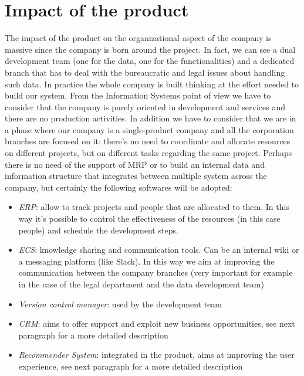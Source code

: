 \documentclass[../main.tex]{subfiles}
\begin{document}
    \section{Impact of the product}
    The impact of the product on the organizational aspect of the company is massive since the company is born around the project. In fact, we can see a dual development team (one for the data, one for the functionalities) and a dedicated branch that has to deal with the bureaucratic and legal issues about handling such data. In practice the whole company is built thinking at the effort needed to build our system.
    From the Information Systems point of view we have to consider that the company is purely oriented in development and services and there are no production activities. In addition we have to consider that we are in a phase where our company is a single-product company and all the corporation branches are focused on it: there’s no need to coordinate and allocate resources on different projects, but on different tasks regarding the same project. Perhaps there is no need of the support of MRP or to build an internal data and information structure that integrates between multiple system across the company, but certainly the following softwares will be adopted:
    \begin{itemize}
        \item \textit{ERP}: allow to track projects and people that are allocated to them. In this way it’s possible to control the effectiveness of the resources (in this case people) and schedule the development steps.
        \item \textit{ECS}: knowledge sharing and communication tools. Can be an internal wiki or a messaging platform (like Slack). In this way we aim at improving the communication between the company branches (very important for example in the case of the legal department  and the data development team)
        \item \textit{Version control manager}: used by the development team
        \item \textit{CRM}: aims to offer support and exploit new business opportunities, see next paragraph for a more detailed description
        \item \textit{Recommender System}: integrated in the product, aims at improving the user experience, see next paragraph for a more detailed description
    \end{itemize}
\end{document}
